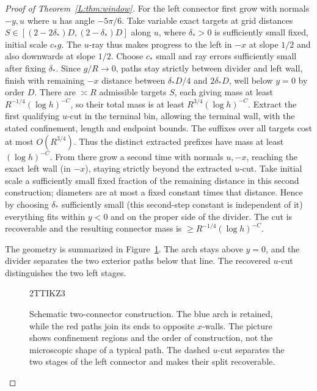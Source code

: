 \documentclass[11pt]{article}
\numberwithin{equation}{section}
\theoremstyle{definition}\newtheorem{definition}[theorem]{Definition}
\theoremstyle{remark}\newtheorem{remark}[theorem]{Remark}
\begin{document}
\begin{proof}[Proof of Theorem~\ref{L:thm:window}]
For the left connector first grow with normals \(-y,u\) where \(u\) has angle \(-5\pi/6\). Take variable exact targets at grid distances \(S\in[(2-2\delta_*)D,(2-\delta_*)D]\) along \(u\), where \(\delta_*>0\) is sufficiently small fixed, initial scale \(c_* g\). The \(u\)-ray thus makes progress to the left in \(-x\) at slope \(1/2\) and also downwards at slope \(1/2\). Choose \(c_*\) small and ray errors sufficiently small after fixing \(\delta_*\). Since \(g/R\to0\), paths stay strictly between divider and left wall, finish with remaining \(-x\) distance between \(\delta_*D/4\) and \(2\delta_*D\), well below \(y=0\) by order \(D\). There are $\asymp R$ admissible targets $S$, each giving mass at least
$R^{-1/4}(\log h)^{-C}$, so their total mass is at least
$R^{3/4}(\log h)^{-C}$. Extract the first qualifying $u$-cut in the
terminal bin, allowing the terminal wall, with the stated confinement,
length and endpoint bounds. The suffixes over all targets cost at most
$O(R^{3/4})$. Thus the distinct extracted prefixes have mass at least
$(\log h)^{-C}$. From there grow a second time with normals \(u,-x\), reaching the exact left wall (in \(-x\)), staying strictly beyond the extracted \(u\)-cut. Take initial scale a sufficiently small fixed fraction of the remaining distance in this second construction; diameters are at most a fixed constant times that distance. Hence by choosing \(\delta_*\) sufficiently small (this second-step constant is independent of it) everything fits within \(y<0\) and on the proper side of the divider. The cut is recoverable and the resulting connector mass is \(\ge R^{-1/4}(\log h)^{-C}\).

The geometry is summarized in Figure~\ref{L:fig:connectors}. The arch
stays above $y=0$, and the divider separates the two exterior paths below
that line. The recovered $u$-cut distinguishes the two left stages.
\begin{figure}[htbp]
\centeringZQT2TTIKZ3

\caption{Schematic two-connector construction. The blue arch is retained,
while the red paths join its ends to opposite $x$-walls. The picture shows
confinement regions and the order of construction, not the microscopic
shape of a typical path. The dashed $u$-cut separates the two stages of the left connector
and makes their split recoverable.}\label{L:fig:connectors}
\end{figure}



\end{proof}
\end{document}

